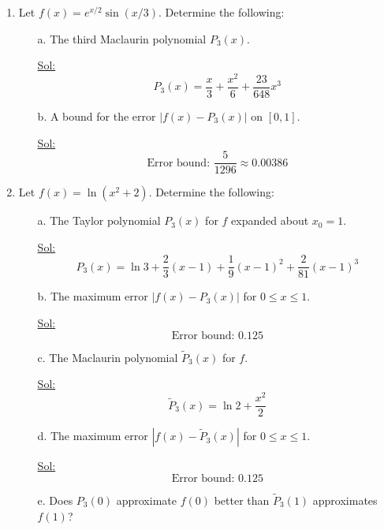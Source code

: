 \begin{enumerate}
\item Let \( f(x) = e^{x/2} \sin(x/3) \). Determine the following:
  \begin{itemize}
    \item[a.] The third Maclaurin polynomial \( P_3(x) \).

      \underline{Sol:}\\
      \[
        P_3(x) = \frac{x}{3} + \frac{x^2}{6} + \frac{23}{648}x^3
      \]
      \bigbreak

    \item[b.] A bound for the error \( |f(x) - P_3(x)| \) on \([0,1]\).

      \underline{Sol:}\\
      \[
        \textrm{Error bound: } \frac{5}{1296} \approx 0.00386
      \]
      \bigbreak
  \end{itemize}

\item Let \( f(x) = \ln(x^2 + 2) \). Determine the following:
  \begin{itemize}
    \item[a.] The Taylor polynomial \( P_3(x) \) for \( f \) expanded
      about \( x_0 = 1 \).

      \underline{Sol:}\\
      \[
        P_3(x) = \ln 3 + \frac{2}{3}(x-1) + \frac{1}{9}(x-1)^2 +
        \frac{2}{81}(x-1)^3
      \]
      \bigbreak

    \item[b.] The maximum error \( |f(x) - P_3(x)| \) for \( 0 \leq x \leq 1 \).

      \underline{Sol:}\\
      \[
        \textrm{Error bound: } 0.125
      \]
      \bigbreak

    \item[c.] The Maclaurin polynomial \( \tilde{P}_3(x) \) for \( f \).

      \underline{Sol:}\\
      \[
        \tilde{P}_3(x) = \ln 2 + \frac{x^2}{2}
      \]
      \bigbreak

    \item[d.] The maximum error \( |f(x) - \tilde{P}_3(x)| \) for \(
      0 \leq x \leq 1 \).

      \underline{Sol:}\\
      \[
        \textrm{Error bound: } 0.125
      \]
      \bigbreak

    \item[e.] Does \( P_3(0) \) approximate \( f(0) \) better than \(
      \tilde{P}_3(1) \) approximates \( f(1) \)?


\end{itemize}
\end{enumerate}
